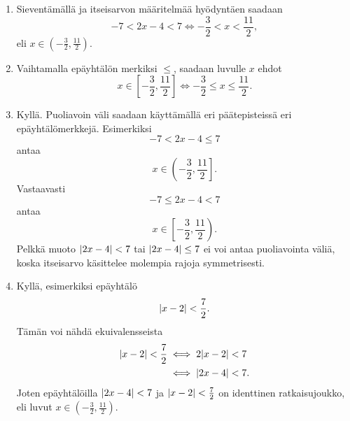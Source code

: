 \documentclass[11pt,a4paper]{amsart}
\begin{document}
\begin{solution}
\leavevmode\par
\begin{enumerate}[label=\alph*), nosep]
\item Sieventämällä ja itseisarvon määritelmää hyödyntäen saadaan
  \[-7 < 2x - 4 < 7 \iff -\frac{3}{2} < x < \frac{11}{2},\]
  eli \(x \in \left(-\frac{3}{2}, \frac{11}{2}\right)\).
  \begin{center}
  \end{center}
\item Vaihtamalla epäyhtälön merkiksi \(\leq\), saadaan luvulle \(x\) ehdot
  \[x \in \left[-\frac{3}{2}, \frac{11}{2}\right] \iff -\frac{3}{2} \leq x \leq
  \frac{11}{2}.\]
  \begin{center}
  \end{center}
\item Kyllä. Puoliavoin väli saadaan käyttämällä eri päätepisteissä eri
  epäyhtälömerkkejä. Esimerkiksi
  \[-7 < 2x - 4 \leq 7\]
  antaa
  \[x \in \left(-\frac{3}{2}, \frac{11}{2}\right].\]
  Vastaavasti
  \[-7 \leq 2x - 4 < 7\]
  antaa
  \[x \in \left[-\frac{3}{2}, \frac{11}{2}\right).\]
  Pelkkä muoto \(\lvert2x - 4\rvert < 7\) tai \(\lvert2x - 4\rvert \leq 7\) ei voi antaa
  puoliavointa väliä, koska itseisarvo käsittelee molempia rajoja symmetrisesti.
\item Kyllä, esimerkiksi epäyhtälö
  \[\lvert x - 2\rvert < \frac{7}{2}.\]
  Tämän voi nähdä ekuivalensseista
  \begin{align*}
    \lvert x - 2\rvert < \frac{7}{2} &\iff 2\lvert x - 2\rvert < 7 \\
    &\iff \lvert2x - 4\rvert < 7.
  \end{align*}
  Joten epäyhtälöilla \(\lvert2x - 4\rvert < 7\) ja \(\lvert x - 2\rvert < \frac{7}{2}\)
  on identtinen ratkaisujoukko, eli luvut \(x \in \left(-\frac{3}{2},
  \frac{11}{2}\right)\).
\end{enumerate}
\end{solution}
\end{document}

